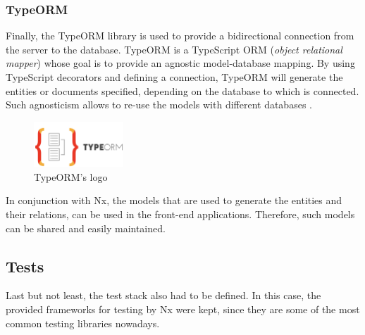 \documentclass[a4paper, 12pt, oneside]{book}
\begin{document}
\subsubsection{TypeORM}
Finally, the TypeORM library is used to provide a bidirectional connection from the server to the database. TypeORM is a TypeScript ORM (\emph{object relational mapper}) whose goal is to provide an agnostic model-database mapping. By using TypeScript decorators and defining a connection, TypeORM will generate the entities or documents specified, depending on the database to which is connected. Such agnosticism allows to re-use the models with different databases \cite{typeorm}.
\begin{figure}[H]
	\centering
	\includegraphics[width=0.3\textwidth]{assets/typeorm-logo.png}
	\caption{TypeORM's logo}
\end{figure}
In conjunction with Nx, the models that are used to generate the entities and their relations, can be used in the front-end applications. Therefore, such models can be shared and easily maintained.
\subsection{Tests}
Last but not least, the test stack also had to be defined. In this case, the provided frameworks for testing by Nx were kept, since they are some of the most common testing libraries nowadays.
\end{document}
